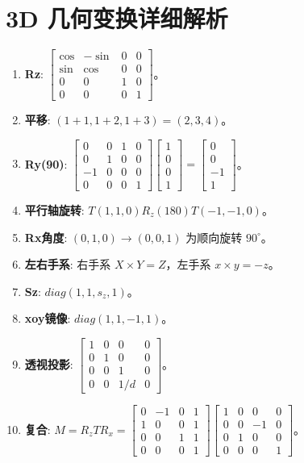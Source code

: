 \documentclass[UTF8]{ctexart}
\begin{document}
\section{3D 几何变换详细解析}
\begin{enumerate}
    \item \textbf{Rz}: $\begin{bmatrix} \cos & -\sin & 0 & 0 \\ \sin & \cos & 0 & 0 \\ 0 & 0 & 1 & 0 \\ 0 & 0 & 0 & 1 \end{bmatrix}$。
    \item \textbf{平移}: $(1+1, 1+2, 1+3) = (2,3,4)$。
    \item \textbf{Ry(90)}: $\begin{bmatrix} 0&0&1&0 \\ 0&1&0&0 \\ -1&0&0&0 \\ 0&0&0&1 \end{bmatrix} \begin{bmatrix} 1\\0\\0\\1 \end{bmatrix} = \begin{bmatrix} 0\\0\\-1\\1 \end{bmatrix}$。
    \item \textbf{平行轴旋转}: $T(1,1,0) R_z(180) T(-1,-1,0)$。
    \item \textbf{Rx角度}: $(0,1,0) \to (0,0,1)$ 为顺向旋转 $90^\circ$。
    \item \textbf{左右手系}: 右手系 $X \times Y = Z$，左手系 $x \times y = -z$。
    \item \textbf{Sz}: $diag(1, 1, s_z, 1)$。
    \item \textbf{xoy镜像}: $diag(1, 1, -1, 1)$。
    \item \textbf{透视投影}: $\begin{bmatrix} 1&0&0&0 \\ 0&1&0&0 \\ 0&0&1&0 \\ 0&0&1/d&0 \end{bmatrix}$。
    \item \textbf{复合}: $M = R_z T R_x = \begin{bmatrix} 0&-1&0&1 \\ 1&0&0&1 \\ 0&0&1&1 \\ 0&0&0&1 \end{bmatrix} \begin{bmatrix} 1&0&0&0 \\ 0&0&-1&0 \\ 0&1&0&0 \\ 0&0&0&1 \end{bmatrix}$。
\end{enumerate}
\end{document}
